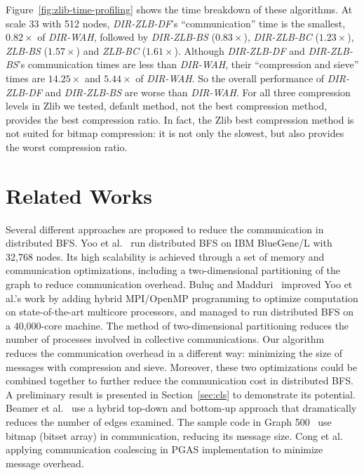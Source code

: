 \documentclass[conference]{IEEEtran}
\begin{document}
Figure~\ref{fig:zlib-time-profiling} shows the time breakdown of these
algorithms. At scale 33 with 512 nodes, \textit{DIR-ZLB-DF}'s
``communication'' time is the smallest, $0.82\times$ of \textit{DIR-WAH},
followed by \textit{DIR-ZLB-BS} ($0.83\times$), \textit{DIR-ZLB-BC}
($1.23\times$), \textit{ZLB-BS} ($1.57\times$) and \textit{ZLB-BC}
($1.61\times$). Although \textit{DIR-ZLB-DF} and \textit{DIR-ZLB-BS}'s
communication times are less than \textit{DIR-WAH}, their ``compression and
sieve'' times are $14.25\times$ and $5.44\times$ of \textit{DIR-WAH}. So the
overall performance of \textit{DIR-ZLB-DF} and \textit{DIR-ZLB-BS} are worse
than \textit{DIR-WAH}. For all three compression levels in Zlib we tested,
default method, not the best compression method, provides the best compression
ratio. In fact, the Zlib best compression method is not suited for bitmap
compression: it is not only the slowest, but also provides the worst
compression ratio.

\section{Related Works}
\label{sec:related}





Several different approaches are proposed to reduce the communication in
distributed BFS.  Yoo et al.~\cite{Yoo:2005} run distributed BFS on IBM
BlueGene/L with 32,768 nodes. Its high scalability is achieved through a set
of memory and communication optimizations, including a two-dimensional
partitioning of the graph to reduce communication overhead. Bulu\c{c} and
Madduri~\cite{Buluc:2011} improved Yoo et al.'s work by adding hybrid
MPI/OpenMP programming to optimize computation on state-of-the-art multicore
processors, and managed to run distributed BFS on a 40,000-core machine. 
The method of two-dimensional partitioning reduces the number of processes
involved in collective communications. Our algorithm reduces the communication
overhead in a different way: minimizing the size of messages with compression
and sieve. Moreover, these two optimizations could be combined together to
further reduce the communication cost in distributed BFS. A preliminary result
is presented in Section~\ref{sec:cls} to demonstrate its potential. Beamer et
al.~\cite{Beamer:EECS-2011-117} use a hybrid top-down and bottom-up approach
that dramatically reduces the number of edges examined. The sample code in
Graph 500~\cite{graph500} use bitmap (bitset array) in communication, reducing
its message size. Cong et al.~\cite{Cong:2010} applying communication
coalescing in PGAS implementation to minimize message overhead.  
\end{document}

